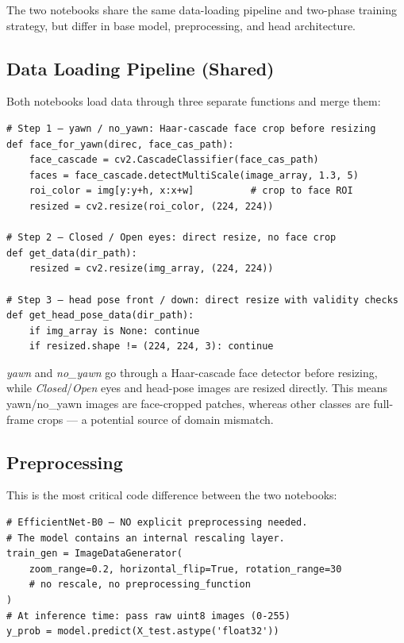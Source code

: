 \documentclass[12pt,a4paper]{article}
\begin{document}
The two notebooks share the same data-loading pipeline and two-phase training
strategy, but differ in base model, preprocessing, and head architecture.

\subsection{Data Loading Pipeline (Shared)}

Both notebooks load data through three separate functions and merge them:

\begin{lstlisting}
# Step 1 — yawn / no_yawn: Haar-cascade face crop before resizing
def face_for_yawn(direc, face_cas_path):
    face_cascade = cv2.CascadeClassifier(face_cas_path)
    faces = face_cascade.detectMultiScale(image_array, 1.3, 5)
    roi_color = img[y:y+h, x:x+w]          # crop to face ROI
    resized = cv2.resize(roi_color, (224, 224))

# Step 2 — Closed / Open eyes: direct resize, no face crop
def get_data(dir_path):
    resized = cv2.resize(img_array, (224, 224))

# Step 3 — head pose front / down: direct resize with validity checks
def get_head_pose_data(dir_path):
    if img_array is None: continue
    if resized.shape != (224, 224, 3): continue
\end{lstlisting}

\begin{tcolorbox}[findingbox, title=Important Design Decision]
\textit{yawn} and \textit{no\_yawn} go through a Haar-cascade face detector before
resizing, while \textit{Closed}/\textit{Open} eyes and head-pose images are resized
directly. This means yawn/no\_yawn images are face-cropped patches, whereas other
classes are full-frame crops — a potential source of domain mismatch.
\end{tcolorbox}

\subsection{Preprocessing}

This is the most critical code difference between the two notebooks:

\begin{tcolorbox}[efftbox]
\begin{lstlisting}
# EfficientNet-B0 — NO explicit preprocessing needed.
# The model contains an internal rescaling layer.
train_gen = ImageDataGenerator(
    zoom_range=0.2, horizontal_flip=True, rotation_range=30
    # no rescale, no preprocessing_function
)
# At inference time: pass raw uint8 images (0-255)
y_prob = model.predict(X_test.astype('float32'))
\end{lstlisting}
\end{tcolorbox}
\end{document}
